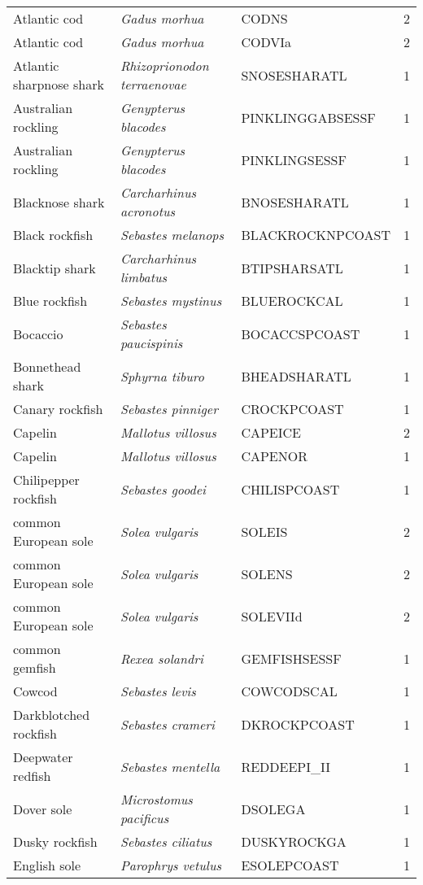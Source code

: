 \begin{center}
\begin{footnotesize}
\begin{longtable}{l | l | l | r}
Atlantic cod & \textit{Gadus morhua} & CODNS & 2 \\
Atlantic cod & \textit{Gadus morhua} & CODVIa & 2 \\
Atlantic sharpnose shark & \textit{Rhizoprionodon terraenovae} & SNOSESHARATL & 1 \\
Australian rockling & \textit{Genypterus blacodes} & PINKLINGGABSESSF & 1 \\
Australian rockling & \textit{Genypterus blacodes} & PINKLINGSESSF & 1 \\
Blacknose shark & \textit{Carcharhinus acronotus} & BNOSESHARATL & 1 \\
Black rockfish & \textit{Sebastes melanops} & BLACKROCKNPCOAST & 1 \\
Blacktip shark & \textit{Carcharhinus limbatus} & BTIPSHARSATL & 1 \\
Blue rockfish & \textit{Sebastes mystinus} & BLUEROCKCAL & 1 \\
Bocaccio & \textit{Sebastes paucispinis} & BOCACCSPCOAST & 1 \\
Bonnethead shark & \textit{Sphyrna tiburo} & BHEADSHARATL & 1 \\
Canary rockfish & \textit{Sebastes pinniger} & CROCKPCOAST & 1 \\
Capelin & \textit{Mallotus villosus} & CAPEICE & 2 \\
Capelin & \textit{Mallotus villosus} & CAPENOR & 1 \\
Chilipepper rockfish & \textit{Sebastes goodei} & CHILISPCOAST & 1 \\
common European sole & \textit{Solea vulgaris} & SOLEIS & 2 \\
common European sole & \textit{Solea vulgaris} & SOLENS & 2 \\
common European sole & \textit{Solea vulgaris} & SOLEVIId & 2 \\
common gemfish & \textit{Rexea solandri} & GEMFISHSESSF & 1 \\
Cowcod & \textit{Sebastes levis} & COWCODSCAL & 1 \\
Darkblotched rockfish & \textit{Sebastes crameri} & DKROCKPCOAST & 1 \\
Deepwater redfish & \textit{Sebastes mentella} & REDDEEPI\_II & 1 \\
Dover sole & \textit{Microstomus pacificus} & DSOLEGA & 1 \\
Dusky rockfish & \textit{Sebastes ciliatus} & DUSKYROCKGA & 1 \\
English sole & \textit{Parophrys vetulus} & ESOLEPCOAST & 1 \\

\end{longtable}
\end{footnotesize}
\end{center}
